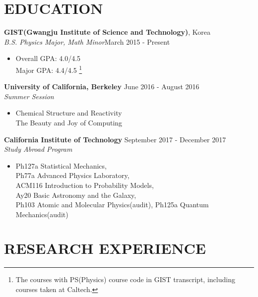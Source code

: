 \documentclass[margin, 10pt]{res} %
\begin{document}
\begin{resume}

 
\section{EDUCATION}  

{\bf GIST(Gwangju Institute of Science and Technology)}, Korea\\
{\sl B.S. Physics Major, Math Minor}\hfill March 2015 - Present
\begin{itemize}
\small\item[] Overall GPA: 4.0/4.5\\
Major GPA: 4.4/4.5 \footnote{The courses with PS(Physics) course code in GIST transcript, including courses taken at Caltech.}
\end{itemize}

{\bf University of California, Berkeley}  \hfill June 2016 - August 2016 \\
{\sl Summer Session}
\begin{itemize}
\small\item[] Chemical Structure and Reactivity\\
The Beauty and Joy of Computing
\end{itemize}

{\bf California Institute of Technology}  \hfill September 2017 - December 2017 \\
{\sl Study Abroad Program}
\begin{itemize}
\small\item[] Ph127a Statistical Mechanics,\\
Ph77a Advanced Physics Laboratory,\\
ACM116 Introduction to Probability Models,\\
Ay20 Basic Astronomy and the Galaxy,\\
Ph103 Atomic and Molecular Physics(audit), Ph125a Quantum Mechanics(audit)
\end{itemize}
 
\section{RESEARCH EXPERIENCE}


\end{resume}
\end{document}

